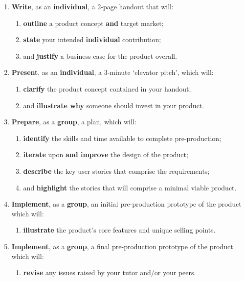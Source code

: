 \documentclass{../fal_assignment}
\begin{document}
\begin{enumerate}[label=(\Alph*)]
    \item \textbf{Write}, as an \textbf{individual}, a 2-page handout that will:
    	\begin{enumerate}[label=\roman*.]
    		\item \textbf{outline} a product concept \textbf{and} target market;
    		\item \textbf{state} your intended \textbf{individual} contribution;
    		\item and \textbf{justify} a business case for the product overall.
	\end{enumerate}
    \item \textbf{Present}, as an \textbf{individual}, a 3-minute `elevator pitch', which will:
    	\begin{enumerate}[label=\roman*.]
    		\item \textbf{clarify} the product concept contained in your handout;
    		\item and \textbf{illustrate why} someone should invest in your product.
	\end{enumerate}
    \item \textbf{Prepare}, as a \textbf{group}, a plan, which will:
    	\begin{enumerate}[label=\roman*.]
    	    	\item \textbf{identify} the skills and time available to complete pre-production;
    	    	\item \textbf{iterate} upon \textbf{and improve} the design of the product;
    		\item \textbf{describe} the key user stories that comprise the requirements;
    		\item and \textbf{highlight} the stories that will comprise a minimal viable product.
	\end{enumerate}
    \item \textbf{Implement}, as a \textbf{group}, an initial pre-production prototype of the product which will:
    	\begin{enumerate}[label=\roman*.]
    		\item \textbf{illustrate} the product's core features and unique selling points.
	\end{enumerate}
    \item \textbf{Implement}, as a \textbf{group}, a final pre-production prototype of the product which will:
    	\begin{enumerate}[label=\roman*.]
    		\item \textbf{revise} any issues raised by your tutor and/or your peers.

\end{enumerate}
\end{enumerate}
\end{document}

